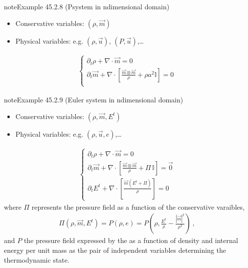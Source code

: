 \documentclass[letterpaper,10pt,english]{jupyterBook}
\begin{document}
\label{ch/pde/hyperbolic-dimensions:example-7}
\begin{sphinxadmonition}{note}{Example 45.2.8 (P\sphinxhyphen{}system in n\sphinxhyphen{}dimensional domain)}


\begin{itemize}
\item {} 
\sphinxAtStartPar
Conservative variables: \((\rho, \vec{m})\)

\item {} 
\sphinxAtStartPar
Physical variables: e.g. \((\rho, \vec{u})\), \((P, \vec{u})\),…

\end{itemize}
\begin{equation*}
\begin{split}\begin{cases}
  \partial_t \rho + \nabla \cdot \vec{m} = 0 \\
  \partial_t \vec{m} + \nabla \cdot \left[ \frac{\vec{m}\otimes\vec{m}}{\rho} + \rho a^2 \mathbb{I} \right] = 0 \\
\end{cases}\end{split}
\end{equation*}\end{sphinxadmonition}
\label{ch/pde/hyperbolic-dimensions:example-8}
\begin{sphinxadmonition}{note}{Example 45.2.9 (Euler system in n\sphinxhyphen{}dimensional domain)}


\begin{itemize}
\item {} 
\sphinxAtStartPar
Conservative variables: \((\rho, \vec{m}, E^t)\)

\item {} 
\sphinxAtStartPar
Physical variables: e.g. \((\rho, \vec{u}, e)\),…

\end{itemize}
\begin{equation*}
\begin{split}\begin{cases}
  \partial_t \rho + \nabla \cdot \vec{m} = 0 \\
  \partial_t \vec{m} + \nabla \cdot \left[ \frac{\vec{m}\otimes\vec{m}}{\rho} + \Pi \, \mathbb{I} \right] = \vec{0} \\
  \partial_t E^t + \nabla \cdot \left[ \frac{\vec{m} (E^t + \Pi)}{\rho} \right] = 0
\end{cases}\end{split}
\end{equation*}
\sphinxAtStartPar
where \(\Pi\) represents the pressure field as a function of the conservative varaibles,
\begin{equation*}
\begin{split}\Pi\left(\rho, \vec{m}, E^t\right) = P\left( \rho, e\right) = P\left( \rho, \frac{E^t}{\rho}-\frac{|\vec{m}|^2}{\rho^3}  \right) \ ,\end{split}
\end{equation*}
\sphinxAtStartPar
and \(P\) the pressure field expressed by the  as a function of density and internal energy per unit mass as the pair of independent variables determining the thermodynamic state.
\end{sphinxadmonition}
\end{document}
